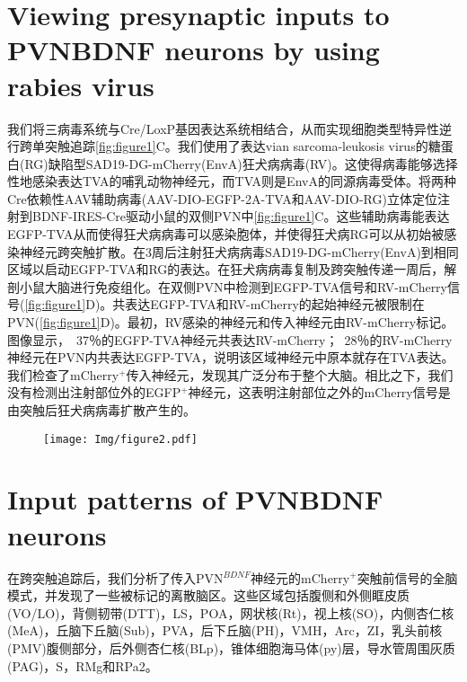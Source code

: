 \section{Viewing presynaptic inputs to PVNBDNF neurons by using rabies virus}
我们将三病毒系统与Cre/LoxP基因表达系统\citep{wickersham2007monosynaptic}相结合，从而实现细胞类型特异性逆行跨单突触追踪\figurename{\ref{fig:figure1}C}。我们使用了表达vian sarcoma-leukosis virus的糖蛋白(RG)缺陷型SAD19-DG-mCherry(EnvA)狂犬病病毒(RV)。这使得病毒能够选择性地感染表达TVA的哺乳动物神经元，而TVA则是EnvA的同源病毒受体。将两种Cre依赖性AAV辅助病毒(AAV-DIO-EGFP-2A-TVA和AAV-DIO-RG)立体定位注射到BDNF-IRES-Cre驱动小鼠的双侧PVN中\figurename{\ref{fig:figure1}C}。这些辅助病毒能表达EGFP-TVA从而使得狂犬病病毒可以感染胞体，并使得狂犬病RG可以从初始被感染神经元跨突触扩散。在3周后注射狂犬病病毒SAD19-DG-mCherry(EnvA)到相同区域以启动EGFP-TVA和RG的表达。在狂犬病病毒复制及跨突触传递一周后，解剖小鼠大脑进行免疫组化。在双侧PVN中检测到EGFP-TVA信号和RV-mCherry信号(\figurename{\ref{fig:figure1}D})。共表达EGFP-TVA和RV-mCherry的起始神经元被限制在PVN(\figurename{\ref{fig:figure1}D})。最初，RV感染的神经元和传入神经元由RV-mCherry标记。图像显示，~37％的EGFP-TVA神经元共表达RV-mCherry；~28％的RV-mCherry神经元在PVN内共表达EGFP-TVA，说明该区域神经元中原本就存在TVA表达。我们检查了mCherry$^{+}$传入神经元，发现其广泛分布于整个大脑。相比之下，我们没有检测出注射部位外的EGFP$^{+}$神经元，这表明注射部位之外的mCherry信号是由突触后狂犬病病毒扩散产生的。

\begin{figure}[!htbp]
    \centering
    \texttt{[image: Img/figure2.pdf]}
    \label{fig:figure2}
\end{figure}


\section{Input patterns of PVNBDNF neurons}
在跨突触追踪后，我们分析了传入PVN$^{BDNF}$神经元的mCherry$^{+}$突触前信号的全脑模式，并发现了一些被标记的离散脑区。这些区域包括腹侧和外侧眶皮质(VO/LO)，背侧韧带(DTT)，LS，POA，网状核(Rt)，视上核(SO)，内侧杏仁核(MeA)，丘脑下丘脑(Sub)，PVA，后下丘脑(PH)，VMH，Arc，ZI，乳头前核(PMV)腹侧部分，后外侧杏仁核(BLp)，锥体细胞海马体(py)层，导水管周围灰质(PAG)，S，RMg和RPa\figurename{2}。

